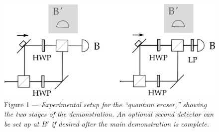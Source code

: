 \begin{figure}[h]
  \centering
    \includegraphics[width=4.53in,height=1.99in]{images/15_quantum-eraser/complete.png}
    \captionsetup{width=.75\textwidth}
    \caption*{Figure 1 --- \emph{Experimental setup for the ``quantum eraser,'' showing the two stages of the 
    demonstration. An optional second detector can be set up at $B'$ if desired after the main demonstration is complete.}}
\end{figure}

